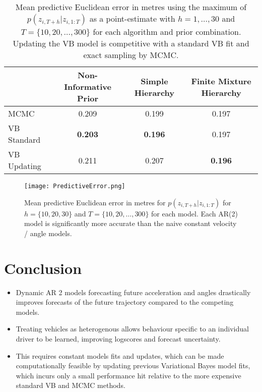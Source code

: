 \documentclass[12pt,a4paper]{article}\usepackage[]{graphicx}\usepackage[]{color}
\begin{document}
\begin{center}
\begin{table}[h]
\begin{tabular}{| l | c | c | c |}
\hline
& Non-Informative Prior & Simple Hierarchy & Finite Mixture Hierarchy \\
\hline
MCMC & 0.209 & 0.199 & 0.197 \\
VB Standard & \textbf{0.203} & \textbf{0.196} & 0.197 \\
VB Updating & 0.211 & 0.207 & \textbf{0.196} \\
\hline
\end{tabular}
\label{tableError}
\caption{Mean predictive Euclidean error in metres using the maximum of $p(z_{i, T+h} | z_{i, 1:T})$ as a point-estimate with $h = 1, \dots, 30$ and $T = \{10, 20, \dots, 300\}$ for each algorithm and prior combination. Updating the VB model is competitive with a standard VB fit and exact sampling by MCMC.}
\end{table}
\end{center}

\begin{figure}[t]
\centering
\texttt{[image: PredictiveError.png]}
\caption{Mean predictive Euclidean error in metres for $p(z_{i, T+h} | z_{i, 1:T})$ for $h = \{10, 20, 30\}$ and $T = \{10, 20, \dots, 300\}$ for each model. Each AR(2) model is significantly more accurate than the naive constant velocity / angle models.}
\label{fig:PredError}
\end{figure}

\section{Conclusion}
\begin{itemize}
\item Dynamic AR 2 models forecasting future acceleration and angles drastically improves forecasts of the future trajectory compared to the competing models.
\item Treating vehicles as heterogenous allows behaviour specific to an individual driver to be learned, improving logscores and forecast uncertainty.
\item This requires constant models fits and updates, which can be made computationally feasible by updating previous Variational Bayes model fits, which incurs only a small performance hit relative to the more expensive standard VB and MCMC methods.
\end{itemize}
\end{document}
